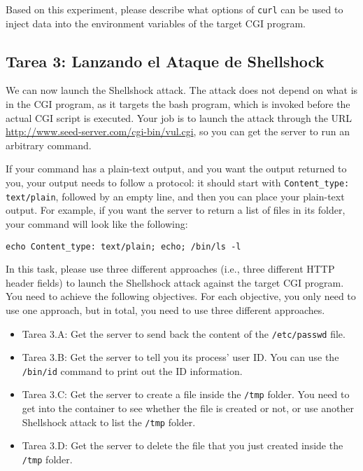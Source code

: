 Based on this experiment, please describe what options of \texttt{curl} 
can be used to inject data into the environment variables of 
the target CGI program. 


\subsection{Tarea 3: Lanzando el Ataque de Shellshock}

We can now launch the Shellshock attack. 
The attack does not depend on what is in the CGI program, as it targets
the bash program, which is invoked before the actual CGI script is
executed. Your job is to launch the attack through the URL
\url{http://www.seed-server.com/cgi-bin/vul.cgi}, so you can
get the server to run an arbitrary command. 


If your command has a plain-text output, and you want the output returned to you,
your output needs to follow a protocol: it should start with 
\texttt{Content\_type: text/plain}, followed by an empty line, and then
you can place your plain-text output. For example, if you want the
server to return a list of files in its folder, your command  
will look like the following: 

\begin{lstlisting}
echo Content_type: text/plain; echo; /bin/ls -l
\end{lstlisting}
 

In this task, please use three different approaches (i.e., three different HTTP header fields)
to launch the Shellshock attack against the target CGI program. You need to achieve 
the following objectives. For each objective, you only need to use one approach,
but in total, you need to use three different approaches. 

\begin{itemize}
\item Tarea 3.A: Get the server to send back the content of the \texttt{/etc/passwd} file. 

\item Tarea 3.B: Get the server to tell you its process' user ID. You can use 
the \texttt{/bin/id} command to print out the ID information. 

\item Tarea 3.C: Get the server to create a file inside the \texttt{/tmp} folder. You need to 
get into the container to see whether the file is created or not, or use 
another Shellshock attack to list the \texttt{/tmp} folder.

\item Tarea 3.D: Get the server to delete the file that you just created 
inside the \texttt{/tmp} folder. 
\end{itemize} 


